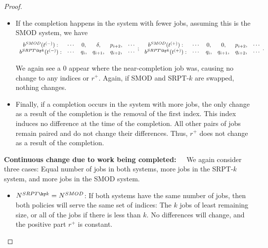 \documentclass[acmsmall]{acmart}
\begin{document}
\begin{proof}
\begin{itemize}
    \item If the completion happens in the system with fewer jobs, assuming this is the SMOD system, we have
        \begin{align*}
        \begin{array}{c} 
            b^{SMOD}(t^{(-)}): \\ b^{SRPT\hy k}(t^{(-)}): \\
        \end{array}
        \begin{array}{ccccc}
            \cdots & 0, & \delta, & p_{i+2}, & \cdots \\
            \cdots & q_i, & q_{i+1}, & q_{i+2}, & \cdots \\
        \end{array} 
        ; \;
        \begin{array}{c} 
            b^{SMOD}(t^{(+)}): \\ b^{SRPT\hy k}(t^{(+)}): \\
        \end{array}
        \begin{array}{cccccc}
            \cdots & 0, & 0, & p_{i+2}, & \cdots \\
            \cdots & q_i, & q_{i+1}, & q_{i+2}, & \cdots \\
        \end{array} .
    \end{align*}

    We again see a 0 appear where the near-completion job was, causing no change to any indices or $r^+$. Again, if SMOD and SRPT-$k$ are swapped, nothing changes.

    \item Finally, if a completion occurs in the system with more jobs, 
    the only change as a result of the completion is the removal of the first index. This index induces no difference at the time of the completion. All other pairs of jobs remain paired and do not change their differences. Thus, $r^+$ does not change as a result of the completion.
    \end{itemize}

    \textbf{Continuous change due to work being completed:~~} We again consider three cases: Equal number of jobs in both systems, more jobs in the SRPT-$k$ system, and more jobs in the SMOD system.
    \begin{itemize}
        \item $N^{SRPT\hy k}=N^{SMOD}$: If both systems have the same number of jobs, then both policies will serve the same set of indices: The $k$ jobs of least remaining size, or all of the jobs if there is less than $k$. No differences will change, and the positive part $r^+$ is constant.


\end{itemize}
\end{proof}
\end{document}
